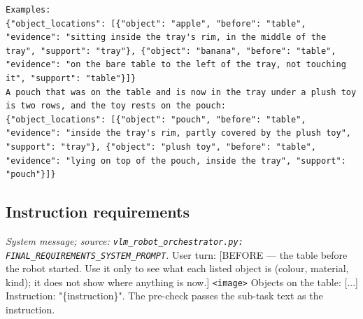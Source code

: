 \begin{lstlisting}[style=prompt]
Examples:
{"object_locations": [{"object": "apple", "before": "table", "evidence": "sitting inside the tray's rim, in the middle of the tray", "support": "tray"}, {"object": "banana", "before": "table", "evidence": "on the bare table to the left of the tray, not touching it", "support": "table"}]}
A pouch that was on the table and is now in the tray under a plush toy is two rows, and the toy rests on the pouch:
{"object_locations": [{"object": "pouch", "before": "table", "evidence": "inside the tray's rim, partly covered by the plush toy", "support": "tray"}, {"object": "plush toy", "before": "table", "evidence": "lying on top of the pouch, inside the tray", "support": "pouch"}]}
\end{lstlisting}
\subsection*{Instruction requirements}
\noindent\textit{System message; source: \texttt{vlm\_robot\_orchestrator.py: FINAL\_REQUIREMENTS\_SYSTEM\_PROMPT}.} User turn: [BEFORE — the table before the robot started. Use it only to see what each listed object is (colour, material, kind); it does not show where anything is now.] \texttt{<image>} Objects on the table: [...] Instruction: "\{instruction\}". The pre-check passes the sub-task text as the instruction.
